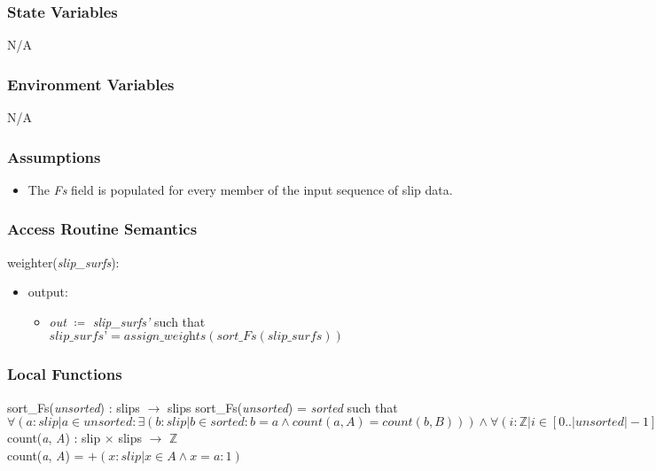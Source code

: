 \documentclass[12pt, titlepage]{article}
\begin{document}
\subsubsection{State Variables}
N/A

\subsubsection{Environment Variables}
N/A

\subsubsection{Assumptions}
\begin{itemize}
	\item The \textit{Fs} field is populated for every member of the input 
	sequence of 
	slip data.
\end{itemize}

\subsubsection{Access Routine Semantics}
weighter(\textit{slip\_surfs}):
\begin{itemize}
	\item output:
	\begin{itemize}
		\item[] \textit{out} $\coloneqq$ \textit{slip\_surfs'} such that 
		$\textit{slip\_surfs'} = 
		\textit{assign\_weights}(\textit{sort\_Fs}({\textit{slip\_surfs}}))$
	\end{itemize}
\end{itemize}

\subsubsection{Local Functions}
sort\_Fs(\textit{unsorted}) : slips $\rightarrow$ slips
sort\_Fs(\textit{unsorted}) = \textit{sorted} such that\\
$\forall(a : \textit{slip} | a \in \textit{unsorted} : \exists(b : 
\textit{slip} | b \in \textit{sorted} : b = a \land \textit{count}(a, A) = 
\textit{count}(b, B))) \land \forall(i : \mathbb{Z} | i \in [0..|unsorted|-1] : 
sorted[i].Fs \leq sorted[i+1].Fs)$\\

\noindent count(\textit{a}, \textit{A}) : slip $\times$ slips $\rightarrow$ 
$\mathbb{Z}$\\
count(\textit{a}, \textit{A}) = $+(x : slip | x \in A \land x = a : 1)$\\
\end{document}
